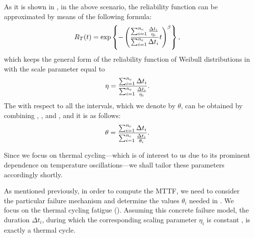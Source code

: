 As it is shown in \cite{xiang2010}, in the above scenario, the reliability
function can be approximated by means of the following formula:
\[
  R_T(t) = \exp\left\{-\left( \frac{\sum_{i = 1}^{n_\mathrm{c}} \frac{\Delta t_i}{\eta_i}}{\sum_{i = 1}^{n_\mathrm{c}} \Delta t_i} t \right)^\beta\right\},
\]
which keeps the general form of the reliability function of Weibull
distributions in  with the scale parameter equal to
\begin{equation} \elab{weibull-eta-all}
  \eta = \frac{\sum_{i = 1}^\nc \dt_i}{\sum_{i = 1}^\nc \frac{\Delta t_i}{\eta_i}}.
\end{equation}
The  with respect to all the intervals, which we denote by $\theta$,
can be obtained by combining , ,
and , and it is as follows:
\[
  \theta = \frac{\sum_{i = 1}^{n_\mathrm{c}} \Delta t_i}{\sum_{i = 1}^{n_\mathrm{c}} \frac{\Delta t_i}{\theta_i}}.
\]

Since we focus on thermal cycling---which is of interest to us due to its
prominent dependence on temperature oscillations---we shall tailor these
parameters accordingly shortly.

As mentioned previously, in order to compute the MTTF, we need to consider the
particular failure mechanism and determine the values $\theta_i$ needed in
. We focus on the thermal cycling fatigue
(). Assuming this concrete failure model, the duration
$\Delta t_i$, during which the corresponding scaling parameter $\eta_i$ is
constant , is exactly a thermal cycle.

